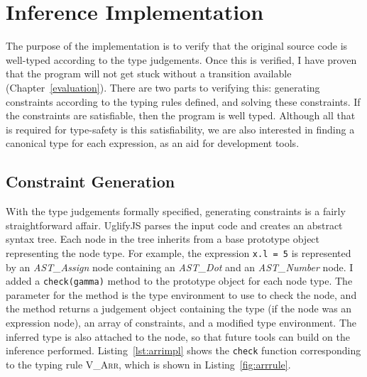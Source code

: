 \documentclass[12pt,a4paper,twoside,openright]{report}
\theoremstyle{definition}
\theoremstyle{dotless}
\newcommand*{\js}{\texttt}
\begin{document}
\section{Inference Implementation}
The purpose of the implementation is to verify that the original source code is
well-typed according to the type judgements. Once this is verified, I have
proven that the program will not get stuck without a transition available (Chapter~\ref{evaluation}).
There are two parts to verifying this: generating constraints according to the
typing rules defined, and solving these constraints. If the constraints are
satisfiable, then the program is well typed. Although all that is required for
type-safety is this satisfiability, we are also interested in finding a
canonical type for each expression, as an aid for development tools.

\subsection{Constraint Generation}

With the type judgements formally specified, generating constraints is a fairly
straightforward affair.  UglifyJS parses the input code and creates an abstract
syntax tree. Each node in the tree inherits from a base prototype object
representing the node type.  For example, the expression \js{x.l = 5} is
represented by an \textit{AST\_Assign} node containing an \textit{AST\_Dot} and
an \textit{AST\_Number} node.  I added a \js{check(gamma)} method to the
prototype object for each node type. The parameter for the method is the type
environment to use to check the node, and the method returns a judgement object
containing the type (if the node was an expression node), an array of
constraints, and a modified type environment. The inferred type is also
attached to the node, so that future tools can build on the inference
performed. Listing~\ref{lst:arrimpl} shows the \js{check} function
corresponding to the typing rule \textsc{V\_Arr}, which is shown in Listing~\ref{fig:arrrule}.
\end{document}

